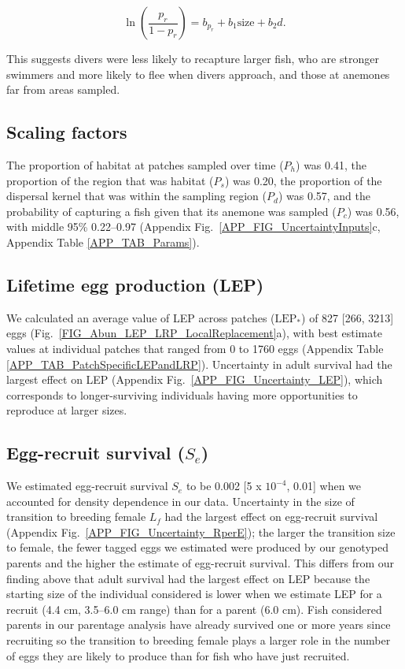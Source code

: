 \documentclass[12pt, oneside]{article}   	%
\begin{document}
\begin{equation}
\ln(\frac{p_r}{1-p_r}) = b_{p_r} + b_1\text{size} + b_2d. \label{APP_EQN_MARK_Recapture}
\end{equation}

This suggests divers were less likely to recapture larger fish, who are stronger swimmers and more likely to flee when divers approach, and those at anemones far from areas sampled.

\subsection{Scaling factors} \label{APP_SEC_RESULTS_ScalingFactors}

The proportion of habitat at patches sampled over time ($P_h$) was 0.41, the proportion of the region that was habitat ($P_s$) was 0.20, the proportion of the dispersal kernel that was within the sampling region ($P_d$) was 0.57, and the probability of capturing a fish given that its anemone was sampled ($P_c$) was 0.56, with middle 95\% 0.22--0.97 (Appendix Fig.\ \ref{APP_FIG_UncertaintyInputs}c, Appendix Table \ref{APP_TAB_Params}).

\subsection{Lifetime egg production (LEP)} \label{APP_SEC_RESULTS_LEP}  

We calculated an average value of LEP across patches ($\text{LEP}_*$) of 827 [266, 3213] eggs (Fig.\ \ref{FIG_Abun_LEP_LRP_LocalReplacement}a), with best estimate values at individual patches that ranged from 0 to 1760 eggs (Appendix Table \ref{APP_TAB_PatchSpecificLEPandLRP}). Uncertainty in adult survival had the largest effect on LEP (Appendix Fig.\ \ref{APP_FIG_Uncertainty_LEP}), which corresponds to longer-surviving individuals having more opportunities to reproduce at larger sizes. 

\subsection{Egg-recruit survival ($S_e$)} \label{APP_SEC_RESULTS_Egg-recruit_survival}  

We estimated egg-recruit survival $S_{e}$ to be 0.002 [5 x $10^{-4}$, 0.01] when we accounted for density dependence in our data. Uncertainty in the size of transition to breeding female $L_f$ had the largest effect on egg-recruit survival (Appendix Fig.\ \ref{APP_FIG_Uncertainty_RperE}); the larger the transition size to female, the fewer tagged eggs we estimated were produced by our genotyped parents and the higher the estimate of egg-recruit survival. This differs from our finding above that adult survival had the largest effect on LEP because the starting size of the individual considered is lower when we estimate LEP for a recruit (4.4 cm, 3.5--6.0 cm range) than for a parent (6.0 cm). Fish considered parents in our parentage analysis have already survived one or more years since recruiting so the transition to breeding female plays a larger role in the number of eggs they are likely to produce than for fish who have just recruited. 
\end{document}
